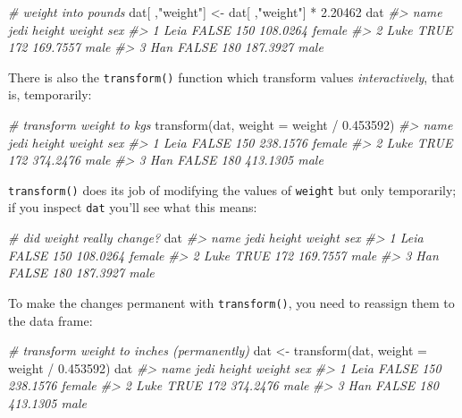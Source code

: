 \documentclass[
]{book}
\newenvironment{Shaded}{\begin{snugshade}}{\end{snugshade}}
\newcommand{\AttributeTok}[1]{\textcolor[rgb]{0.77,0.63,0.00}{#1}}
\newcommand{\CommentTok}[1]{\textcolor[rgb]{0.56,0.35,0.01}{\textit{#1}}}
\newcommand{\FloatTok}[1]{\textcolor[rgb]{0.00,0.00,0.81}{#1}}
\newcommand{\FunctionTok}[1]{\textcolor[rgb]{0.00,0.00,0.00}{#1}}
\newcommand{\NormalTok}[1]{#1}
\newcommand{\OtherTok}[1]{\textcolor[rgb]{0.56,0.35,0.01}{#1}}
\newcommand{\SpecialCharTok}[1]{\textcolor[rgb]{0.00,0.00,0.00}{#1}}
\newcommand{\StringTok}[1]{\textcolor[rgb]{0.31,0.60,0.02}{#1}}
\begin{document}
\begin{Shaded}
\begin{Highlighting}[]
\CommentTok{\# weight into pounds}
\NormalTok{dat[ ,}\StringTok{"weight"}\NormalTok{] }\OtherTok{\textless{}{-}}\NormalTok{ dat[ ,}\StringTok{"weight"}\NormalTok{] }\SpecialCharTok{*} \FloatTok{2.20462}
\NormalTok{dat}
\CommentTok{\#\textgreater{}   name  jedi height   weight    sex}
\CommentTok{\#\textgreater{} 1 Leia FALSE    150 108.0264 female}
\CommentTok{\#\textgreater{} 2 Luke  TRUE    172 169.7557   male}
\CommentTok{\#\textgreater{} 3  Han FALSE    180 187.3927   male}
\end{Highlighting}
\end{Shaded}

There is also the \texttt{transform()} function which transform values \emph{interactively},
that is, temporarily:

\begin{Shaded}
\begin{Highlighting}[]
\CommentTok{\# transform weight to kgs}
\FunctionTok{transform}\NormalTok{(dat, }\AttributeTok{weight =}\NormalTok{ weight }\SpecialCharTok{/} \FloatTok{0.453592}\NormalTok{)}
\CommentTok{\#\textgreater{}   name  jedi height   weight    sex}
\CommentTok{\#\textgreater{} 1 Leia FALSE    150 238.1576 female}
\CommentTok{\#\textgreater{} 2 Luke  TRUE    172 374.2476   male}
\CommentTok{\#\textgreater{} 3  Han FALSE    180 413.1305   male}
\end{Highlighting}
\end{Shaded}

\texttt{transform()} does its job of modifying the values of \texttt{weight} but only
temporarily; if you inspect \texttt{dat} you'll see what this means:

\begin{Shaded}
\begin{Highlighting}[]
\CommentTok{\# did weight really change?}
\NormalTok{dat}
\CommentTok{\#\textgreater{}   name  jedi height   weight    sex}
\CommentTok{\#\textgreater{} 1 Leia FALSE    150 108.0264 female}
\CommentTok{\#\textgreater{} 2 Luke  TRUE    172 169.7557   male}
\CommentTok{\#\textgreater{} 3  Han FALSE    180 187.3927   male}
\end{Highlighting}
\end{Shaded}

To make the changes permanent with \texttt{transform()}, you need to reassign them
to the data frame:

\begin{Shaded}
\begin{Highlighting}[]
\CommentTok{\# transform weight to inches (permanently)}
\NormalTok{dat }\OtherTok{\textless{}{-}} \FunctionTok{transform}\NormalTok{(dat, }\AttributeTok{weight =}\NormalTok{ weight }\SpecialCharTok{/} \FloatTok{0.453592}\NormalTok{)}
\NormalTok{dat}
\CommentTok{\#\textgreater{}   name  jedi height   weight    sex}
\CommentTok{\#\textgreater{} 1 Leia FALSE    150 238.1576 female}
\CommentTok{\#\textgreater{} 2 Luke  TRUE    172 374.2476   male}
\CommentTok{\#\textgreater{} 3  Han FALSE    180 413.1305   male}
\end{Highlighting}
\end{Shaded}
\end{document}
